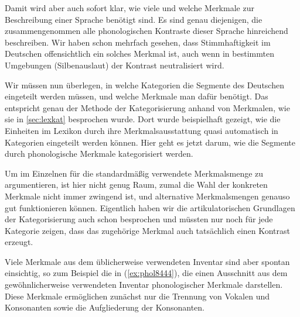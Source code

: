 
Damit wird aber auch sofort klar, wie viele und welche Merkmale zur Beschreibung einer Sprache benötigt sind.
Es sind genau diejenigen, die zusammengenommen alle phonologischen Kontraste dieser Sprache hinreichend beschreiben.
Wir haben schon mehrfach gesehen, dass Stimmhaftigkeit im Deutschen offensichtlich ein solches Merkmal ist, auch wenn in bestimmten Umgebungen (Silbenauslaut) der Kontrast neutralisiert wird.

Wir müssen nun überlegen, in welche Kategorien die Segmente des Deutschen eingeteilt werden müssen, und welche Merkmale man dafür benötigt.
Das entspricht genau der Methode der Kategorisierung anhand von Merkmalen, wie sie in \ref{sec:lexkat} besprochen wurde.
Dort wurde beispielhaft gezeigt, wie die Einheiten im Lexikon durch ihre Merkmalsausstattung quasi automatisch in Kategorien eingeteilt werden können.
Hier geht es jetzt darum, wie die Segmente durch phonologische Merkmale kategorisiert werden.


Um im Einzelnen für die standardmäßig verwendete Merkmalsmenge zu argumentieren, ist hier nicht genug Raum, zumal die Wahl der konkreten Merkmale nicht immer zwingend ist, und alternative Merkmalsmengen genauso gut funktionieren können.
Eigentlich haben wir die artikulatorischen Grundlagen der Kategorisierung auch schon besprochen und müssten nur noch für jede Kategorie zeigen, dass das zugehörige Merkmal auch tatsächlich einen Kontrast erzeugt.

Viele Merkmale aus dem üblicherweise verwendeten Inventar sind aber spontan einsichtig, so zum Beispiel die in (\ref{ex:phol8444}), die einen Ausschnitt aus dem gewöhnlicherweise verwendeten Inventar phonologischer Merkmale darstellen.
Diese Merkmale ermöglichen zunächst nur die Trennung von Vokalen und Konsonanten sowie die Aufgliederung der Konsonanten.

\begin{exe}
  \ex\label{ex:phol8444}
  \begin{xlist}
  \end{xlist}
\end{exe}

